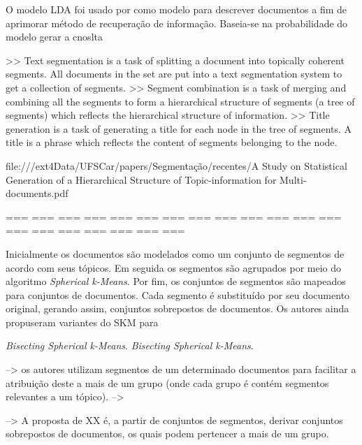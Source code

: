 O modelo LDA foi usado por \cite{XINGWEI} como modelo para descrever documentos a fim de aprimorar método de recuperação de informação. Baseia-se na probabilidade do modelo gerar a cnoslta

















>> Text segmentation is a task of splitting a document into topically coherent segments.  All documents in the set are put into a text segmentation system to get a collection of segments.
>> Segment combination is a task of merging and combining all the segments to form a hierarchical structure of segments (a tree of segments) which reflects the hierarchical structure of information.
>> Title generation is a task of generating a title for each node in the tree of segments. A title is a phrase which reflects the content of segments belonging to the node.


file:///ext4Data/UFSCar/papers/Segmentação/recentes/A Study on Statistical Generation of a Hierarchical Structure of Topic-information for Multi-documents.pdf
~\cite{NGUYEN Viet Cuong}

=== === === === === === === === === === === === === === === === === === === === 



Inicialmente os documentos são modelados como um conjunto de segmentos de acordo com seus tópicos. Em seguida os segmentos são agrupados por meio do algoritmo \textit{Spherical k-Means}\cite{I. S. Dhillon and D. S. Modha,   Y. Zhao and G. Karypis}. Por fim, os conjuntos de segmentos são mapeados para conjuntos de documentos. Cada segmento é substituído por seu documento original, gerando assim, conjuntos sobrepostos de documentos. Os autores ainda propuseram variantes do SKM para 


\textit{Bisecting Spherical k-Means}\cite{Y. Zhao and G. Karypis}.
\textit{Bisecting Spherical k-Means}\cite{I. S. Dhillon and D. S. Modha,   Y. Zhao and G. Karypis}.

--> os autores utilizam segmentos de um determinado documentos para facilitar a atribuição deste a mais de um grupo (onde cada grupo é contém segmentos relevantes a um tópico).
--> 

--> A proposta de XX é, a partir de conjuntos de segmentos, derivar conjuntos sobrepostos de documentos, os quais podem pertencer a mais de um grupo.


